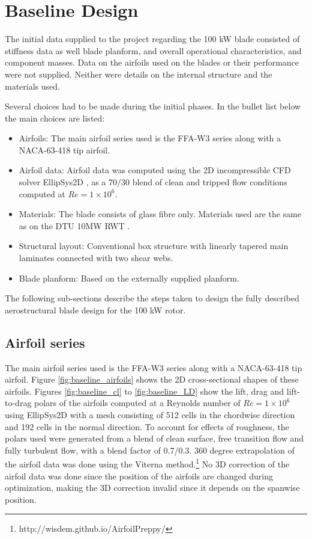\section{Baseline Design}

The initial data supplied to the project regarding the 100 kW blade consisted of stiffness data as well blade planform, and overall operational characteristics, and component masses.
Data on the airfoils used on the blades or their performance were not supplied.
Neither were details on the internal structure and the materials used.

Several choices had to be made during the initial phases.
In the bullet list below the main choices are listed:

\begin{itemize}

	\item Airfoils: The main airfoil series used is the FFA-W3 series along with a NACA-63-418 tip airfoil.
	\item Airfoil data: Airfoil data was computed using the 2D incompressible CFD solver EllipSys2D \cite{michelsen92,michelsen94,sorensen95}, as a 70/30 blend of clean and tripped flow conditions computed at $Re=1\times10^6$.
	\item Materials: The blade consists of glass fibre only. Materials used are the same as on the DTU 10MW RWT \cite{bakrwt}.
	\item Structural layout: Conventional box structure with linearly tapered main laminates connected with two shear webs.
	\item Blade planform: Based on the externally supplied planform.
\end{itemize}


The following sub-sections describe the steps taken to design the fully described aerostructural blade design for the 100 kW rotor.

\subsection{Airfoil series}

The main airfoil series used is the FFA-W3 series along with a NACA-63-418 tip airfoil.
Figure \ref{fig:baseline_airfoils} shows the 2D cross-sectional shapes of these airfoils.
Figures \ref{fig:baseline_cl} to \ref{fig:baseline_LD} show the lift, drag and lift-to-drag polars of the airfoils computed at a Reynolds number of $Re=1\times10^6$ using EllipSys2D with a mesh consisting of 512 cells in the chordwise direction and 192 cells in the normal direction.
To account for effects of roughness, the polars used were generated from a blend of clean surface, free transition flow and fully turbulent flow, with a blend factor of 0.7/0.3.
360 degree extrapolation of the airfoil data was done using the Viterna method.\footnote{http://wisdem.github.io/AirfoilPreppy/} No 3D correction of the airfoil data was done since the position of the airfoils are changed during optimization, making the 3D correction invalid since it depends on the spanwise position.

